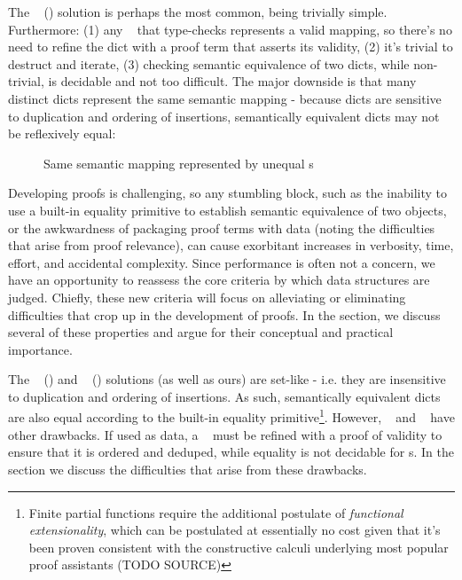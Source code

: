 The \sal~ (\SAL) solution is perhaps the most common, being trivially simple. Furthermore:
 (1) any \SAL~ that type-checks represents a valid mapping,
       so there's no need to refine the dict with a proof term that asserts its validity,
 (2) it's trivial to destruct and iterate,
 (3) checking semantic equivalence of two dicts, while non-trivial, is decidable and not too difficult.
 The major downside is that many distinct dicts
represent the same semantic mapping - because dicts are sensitive to duplication and ordering
of insertions, semantically equivalent dicts may not be reflexively equal:
  \begin{figure}
    \centering
    \caption{Same semantic mapping represented by unequal {\SAL}s}
    \label{fig:uneq}
  \end{figure}
Developing proofs is challenging, so any stumbling block, such as the inability to use a built-in equality
primitive to establish semantic equivalence of two objects, or the awkwardness of packaging
proof terms with data (noting the difficulties that arise from proof relevance), can cause exorbitant
increases in verbosity, time, effort, and accidental complexity. Since performance is often not a concern,
we have an opportunity to reassess the core criteria by which data structures are judged. Chiefly, these
new criteria will focus on alleviating or eliminating difficulties that crop up in the development of
proofs. In the  section, we discuss several of these properties and argue for their
conceptual and practical importance.

The \cal~ (\CAL) and \fpf~ (\FPF) solutions (as well as ours) are set-like - i.e. they are insensitive
to duplication and ordering of insertions. As such, semantically equivalent dicts are also equal according
to the built-in equality primitive\footnote{Finite partial functions require the additional postulate of
\emph{functional extensionality}, which can be postulated
at essentially no cost given that it's been proven consistent with the constructive calculi underlying most
popular proof assistants (TODO SOURCE)}. However, \CAL~ and \FPF~ have other drawbacks.
If used as data, a \CAL~ must be refined with a proof of validity to ensure that it is ordered and deduped,
while equality is not decidable for {\FPF}s. In the  section we discuss the difficulties
that arise from these drawbacks.

